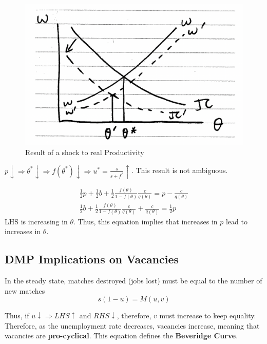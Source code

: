 \documentclass[11pt]{article}
\begin{document}
\begin{figure}[h]
    \centering
    \includegraphics[width=12cm]{photos/shock to p DMP.png}
    \caption{Result of a shock to real Productivity}
    \label{fig:DMP shock p}
\end{figure}

$p \downarrow \Longrightarrow \theta^* \downarrow \Longrightarrow f\left(\theta^*\right) \downarrow \Longrightarrow u^*=\frac{s}{s+f^*} \uparrow$. This result is not ambiguous.

\begin{equation}
\begin{gathered}
\frac{1}{2} p+\frac{1}{2} b+\frac{1}{2} \frac{f(\theta)}{1-f(\theta)} \frac{c}{q(\theta)}=p-\frac{c}{q(\theta)} \\
\frac{1}{2} b+\frac{1}{2} \frac{f(\theta)}{1-f(\theta)} \frac{c}{q(\theta)}+\frac{c}{q(\theta)}=\frac{1}{2} p
\end{gathered}
\end{equation}
LHS is increasing in $\theta$. Thus, this equation implies that increases in $p$ lead to increases in $\theta$.

\subsection{DMP Implications on Vacancies}

In the steady state, matches destroyed (jobs lost) must be equal to the number of new matches
\[s(1-u) = M(u,v)\]

Thus, if $u\downarrow \Rightarrow LHS\uparrow$ 
 and $RHS\downarrow$, therefore, $v$ must increase to keep equality. Therefore, as the unemployment rate decreases, vacancies increase, meaning that vacancies are \textbf{pro-cyclical}. This equation defines the \textbf{Beveridge Curve}.
\end{document}
